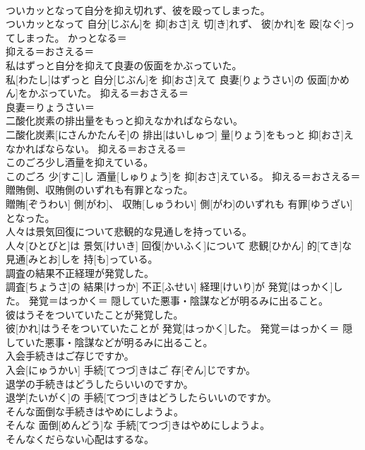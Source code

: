 \documentclass[8pt]{extreport}
\begin{document}
\begin{CJK}{UTF8}{min}
{\\	ついカッとなって自分を抑え切れず、彼を殴ってしまった。	
\\	ついカッとなって 自分[じぶん]を 抑[おさ]え 切[き]れず、 彼[かれ]を 殴[なぐ]ってしまった。	かっとなる＝ 
\\	抑える＝おさえる＝ 
\\	私はずっと自分を抑えて良妻の仮面をかぶっていた。	
\\	私[わたし]はずっと 自分[じぶん]を 抑[おさ]えて 良妻[りょうさい]の 仮面[かめん]をかぶっていた。	抑える＝おさえる＝ 
\\	良妻＝りょうさい＝ 
\\	二酸化炭素の排出量をもっと抑えなかればならない。	
\\	二酸化炭素[にさんかたんそ]の 排出[はいしゅつ] 量[りょう]をもっと 抑[おさ]えなかればならない。	抑える＝おさえる＝ 
\\	このごろ少し酒量を抑えている。	
\\	このごろ 少[すこ]し 酒量[しゅりょう]を 抑[おさ]えている。	抑える＝おさえる＝ 
\\	贈賄側、収賄側のいずれも有罪となった。	
\\	贈賄[ぞうわい] 側[がわ]、 収賄[しゅうわい] 側[がわ]のいずれも 有罪[ゆうざい]となった。	
\\	人々は景気回復について悲観的な見通しを持っている。	
\\	人々[ひとびと]は 景気[けいき] 回復[かいふく]について 悲観[ひかん] 的[てき]な 見通[みとお]しを 持[も]っている。	
\\	調査の結果不正経理が発覚した。	
\\	調査[ちょうさ]の 結果[けっか] 不正[ふせい] 経理[けいり]が 発覚[はっかく]した。	発覚＝はっかく＝ 隠していた悪事・陰謀などが明るみに出ること。
\\	彼はうそをついていたことが発覚した。	
\\	彼[かれ]はうそをついていたことが 発覚[はっかく]した。	発覚＝はっかく＝ 隠していた悪事・陰謀などが明るみに出ること。
\\	入会手続きはご存じですか。	
\\	入会[にゅうかい] 手続[てつづ]きはご 存[ぞん]じですか。	
\\	退学の手続きはどうしたらいいのですか。	
\\	退学[たいがく]の 手続[てつづ]きはどうしたらいいのですか。	
\\	そんな面倒な手続きはやめにしようよ。	
\\	そんな 面倒[めんどう]な 手続[てつづ]きはやめにしようよ。	
\\	そんなくだらない心配はするな。	
}
\end{CJK}
\end{document}
